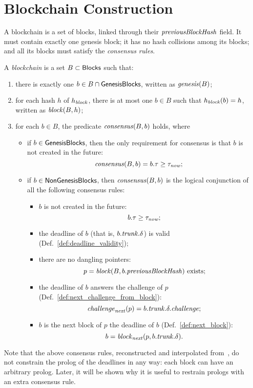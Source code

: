 \section{Blockchain Construction}\label{sec:blockchain_construction}

A blockchain is a set of blocks, linked through their ${\mathit{previousBlockHash}}$ field.
It must contain exactly one genesis block; it has no hash collisions among its blocks;
and all its blocks must satisfy the \emph{consensus rules}.
%
\begin{definition}\label{def:blockchain}
  A \emph{blockchain} is a set $B\subset{\mathsf{Blocks}}$ such that:
  \begin{enumerate}
  \item there is exactly one $b\in B\cap{\mathsf{GenesisBlocks}}$, written as ${\mathit{genesis}}(B)$;
  \item for each hash $h$ of $h_{\mathit{block}}$, there is at most
    one $b\in B$ such that $h_{\mathit{block}}(b)=h$, written as ${\mathit{block}}(B,h)$;
  \item for each $b\in B$, the predicate ${\mathit{consensus}}(B,b)$ holds, where
    \begin{itemize}
    \item if $b\in{\mathsf{GenesisBlocks}}$, then the only requirement for consensus is that
      $b$ is not created in the future:
      \[
      {\mathit{consensus}}(B,b)=b.\tau\ge\tau_{\mathit{now}};
      \]
    \item if $b\in{\mathsf{NonGenesisBlocks}}$, then ${\mathit{consensus}}(B,b)$ is the logical conjunction
      of all the following consensus rules:
      \begin{itemize}
      \item $b$ is not created in the future:
        \[
        b.\tau\ge\tau_{\mathit{now}};
        \]
      \item the deadline of $b$ (that is, $b.{\mathit{trunk}}.\delta$) is valid (Def.~\ref{def:deadline_validity});
      \item there are no dangling pointers:
        \[
        p={\mathit{block}}(B,b.{\mathit{previousBlockHash}})\text{ exists;}
        \]
      \item the deadline of $b$ answers the challenge of $p$ (Def.~\ref{def:next_challenge_from_block}):
        \[
        {\mathit{challenge}}_{\mathit{next}}(p)=b.{\mathit{trunk}}.\delta.{\mathit{challenge}};
        \]
      \item $b$ is the next block of $p$ \wrt the deadline of $b$ (Def.~\ref{def:next_block}):
        \[
        b={\mathit{block}}_{\mathit{next}}(p,b.{\mathit{trunk}}.\delta).
        \]
      \end{itemize}
    \end{itemize}
  \end{enumerate}
\end{definition}
%
Note that the above consensus rules, reconstructed and interpolated
from~\cite{SignumPlotting,SignumSource},
do not constrain the prolog of the deadlines in any way:
each block can have an arbitrary prolog. Later, it will be shown why it is useful to
restrain prologs with an extra consensus rule.

